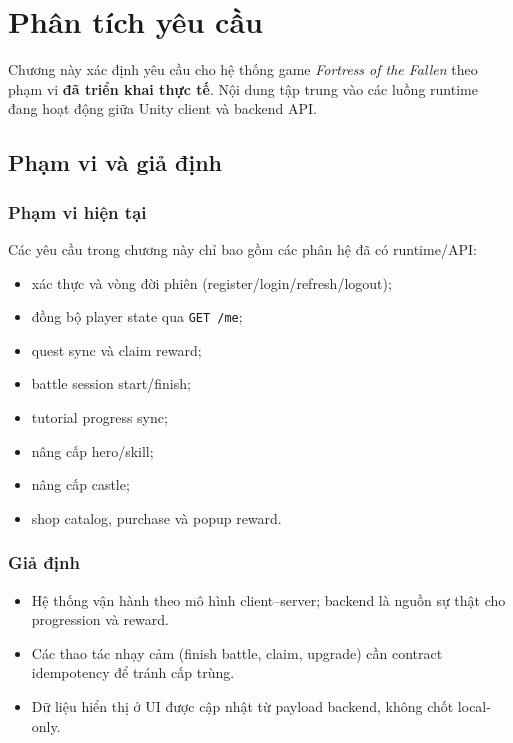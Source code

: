 \section{Phân tích yêu cầu}
\label{sec:requirements}

Chương này xác định yêu cầu cho hệ thống game \textit{Fortress of the Fallen} theo phạm vi \textbf{đã triển khai thực tế}. Nội dung tập trung vào các luồng runtime đang hoạt động giữa Unity client và backend API.

\subsection{Phạm vi và giả định}
\label{subsec:req-scope}

\subsubsection{Phạm vi hiện tại}

Các yêu cầu trong chương này chỉ bao gồm các phân hệ đã có runtime/API:
\begin{itemize}
    \item xác thực và vòng đời phiên (register/login/refresh/logout);
    \item đồng bộ player state qua \texttt{GET /me};
    \item quest sync và claim reward;
    \item battle session start/finish;
    \item tutorial progress sync;
    \item nâng cấp hero/skill;
    \item nâng cấp castle;
    \item shop catalog, purchase và popup reward.
\end{itemize}

\subsubsection{Giả định}

\begin{itemize}
    \item Hệ thống vận hành theo mô hình client--server; backend là nguồn sự thật cho progression và reward.
    \item Các thao tác nhạy cảm (finish battle, claim, upgrade) cần contract idempotency để tránh cấp trùng.
    \item Dữ liệu hiển thị ở UI được cập nhật từ payload backend, không chốt local-only.
\end{itemize}


